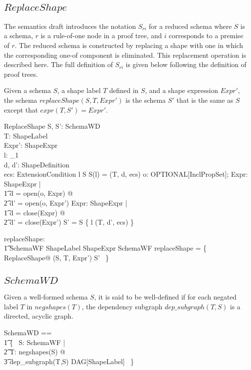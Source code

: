 \documentclass{article}
\begin{document}
\subsection{$ReplaceShape$}
The semantics draft introduces the notation $S_{ri}$ for a reduced schema where $S$ is a schema, 
$r$ is a rule-of-one node in a proof tree, and $i$ corresponds to a premise of $r$.
The reduced schema is constructed by replacing a shape with one in which the corresponding one-of component is eliminated.
This replacement operation is described here.
The full definition of $S_{ri}$ is given below following the definition of proof trees.

Given a schema $S$, a shape label $T$ defined in $S$, and a shape expression $Expr'$, the schema $replaceShape(S,T,Expr')$
is the schema $S'$ that is the same as $S$ except that $expr(T,S') = Expr'$.
\begin{schema}{ReplaceShape}
	S, S': SchemaWD \\
	T: ShapeLabel \\
	Expr': ShapeExpr \\
	l: \nat_1\\
	d, d': ShapeDefinition \\
	ecs: \seq ExtensionCondition
\where
	l \in \dom S
\also
	S(l) = (T, d, ecs)
\also
	\forall o: OPTIONAL[InclPropSet]; Expr: ShapeExpr | \\
\t1		d = open(o, Expr) @ \\
\t2			d' = open(o, Expr')
\also
	\forall Expr: ShapeExpr | \\
\t1		d = close(Expr) @ \\
\t2			d' = close(Expr')
\also
	S' = S \oplus \{ l \mapsto (T, d', ecs) \}
\end{schema}

\begin{axdef}
	replaceShape: \\
\t1		SchemaWF \cross ShapeLabel \cross ShapeExpr \pfun SchemaWF
\where
	replaceShape = \{~ ReplaceShape@ (S, T, Expr') \mapsto S' ~\}
\end{axdef}

\subsection{$SchemaWD$}
Given a well-formed schema $S$, it is said to be well-defined if for each negated label $T$ in $negshapes(T)$, the dependency subgraph
$dep\_subgraph(T,S)$ is a directed, acyclic graph.
\begin{zed}
	SchemaWD == \\
\t1		\{~ S: SchemaWF | \\
\t2			\forall T: negshapes(S) @ \\
\t3				dep\_subgraph(T,S) \in DAG[ShapeLabel] ~\}
\end{zed}
\end{document}
